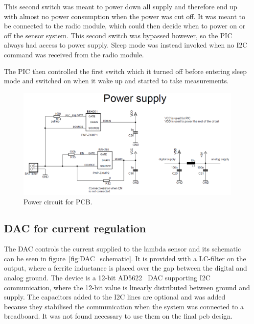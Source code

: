 This second switch was meant to power down all supply and therefore end up with almost no power consumption when the power was cut off. It was meant to be connected to the radio module, which could then decide when to power on or off the sensor system. This second switch was bypassed however, so the PIC always had access to power supply. Sleep mode was instead invoked when no I2C command was received from the radio module.

The PIC then controlled the first switch which it turned off before entering sleep mode and switched on when it wake up and started to take measurements.


\begin{figure}
    \centering
    \includegraphics[width = \textwidth]{Chapter3/Figures/supply_schematic.png}
    \caption{Power circuit for PCB.}
    \label{fig:supply_schematic}
\end{figure}


\subsection{DAC for current regulation}

The DAC controls the current supplied to the lambda sensor and its schematic can be seen in figure~\ref{fig:DAC_schematic}. It is provided with a LC-filter on the output, where a ferrite inductance is placed over the gap between the digital and analog ground. The device is a 12-bit AD5622~\cite{AD5622} DAC supporting I2C communication, where the 12-bit value is linearly distributed between ground and supply. The capacitors added to the I2C lines are optional and was added because they stabilised the communication when the system was connected to a breadboard. It was not found necessary to use them on the final \ac{pcb} design.



